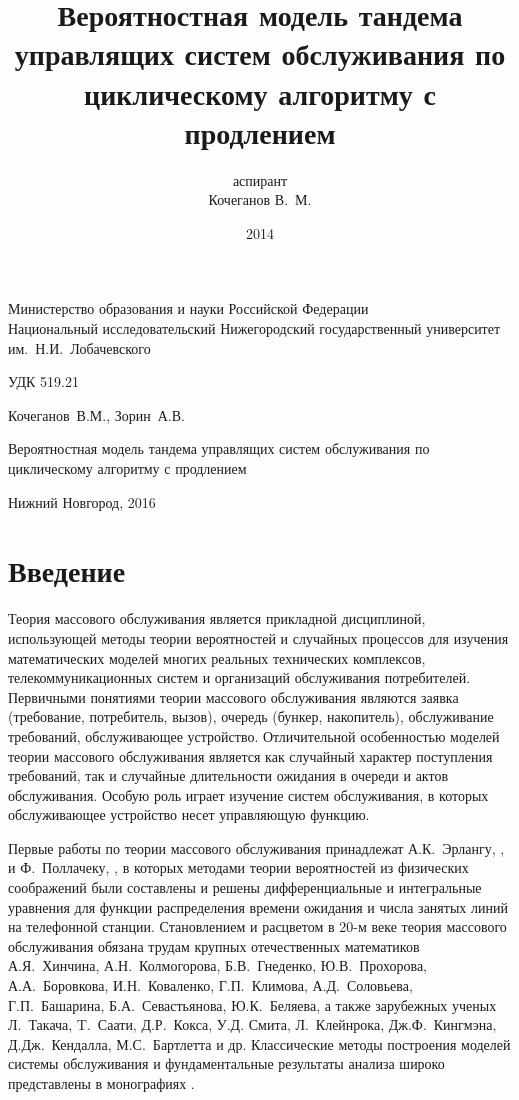 \documentclass[a4paper,12pt,russian]{extarticle}
\title{Вероятностная модель тандема управлящих систем обслуживания по циклическому алгоритму с продлением}
\author{аспирант \\ Кочеганов В.~М.}
\date{2014}
\begin{document}
\begin{titlepage}
\large
\begin{center}
Министерство образования и науки Российской Федерации\\
Национальный исследовательский Нижегородский государственный университет им.~Н.И.~Лобачевского 

\medskip

\begin{flushright}
УДК 519.21
\end{flushright}

\vfill

Кочеганов~В.М., Зорин~А.В.

\medskip

Вероятностная модель тандема управлящих систем обслуживания по циклическому алгоритму с продлением

\vfill

Нижний Новгород, 2016
\end{center}
\end{titlepage}

\setcounter{page}{2}
\section*{Введение}
Теория массового обслуживания является прикладной дисциплиной, использующей методы теории вероятностей и случайных процессов для  изучения математических моделей многих реальных технических комплексов, телекоммуникационных систем и организаций обслуживания потребителей. 
Первичными понятиями теории массового обслуживания являются заявка (требование, потребитель, вызов), очередь (бункер, накопитель), обслуживание требований, обслуживающее устройство.
Отличительной особенностью моделей теории массового обслуживания является как случайный характер поступления требований, так и случайные длительности ожидания в очереди и актов обслуживания.
Особую роль играет изучение систем обслуживания, в которых обслуживающее устройство несет управляющую функцию.

Первые работы по теории массового обслуживания принадлежат А.К.~Эрлангу, \cite{Erlang:1909, Erlang:1917}, и Ф.~Поллачеку, \cite{Pollaczek:1934}, в которых методами теории вероятностей из физических соображений были составлены и решены дифференциальные и интегральные уравнения для функции распределения времени ожидания и числа занятых линий на телефонной станции. 
Становлением и расцветом в 20-м веке теория массового обслуживания обязана трудам крупных отечественных математиков 
А.Я.~Хинчина, А.Н.~Колмогорова, Б.В.~Гнеденко, Ю.В.~Прохорова, А.А.~Боровкова, И.Н.~Коваленко, Г.П.~Климова, А.Д.~Соловьева, Г.П.~Башарина, Б.А.~Севастьянова, Ю.К.~Беляева,
а также зарубежных ученых Л.~Такача, T.~Саати, Д.Р.~Кокса, У.Д. Смита, Л.~Клейнрока, Дж.Ф.~Кингмэна, Д.Дж.~Кендалла, М.С.~Бартлетта и др. 
Классические методы построения моделей системы обслуживания и фундаментальные результаты анализа широко представлены в монографиях \cite{Hinchin:2010, Klimov:1966, Gnedenko:2012, Saati:1971, Bocharov:1995, Asmussen:2008, Borovkov:1972, Borovkov:1980}.
\end{document}
